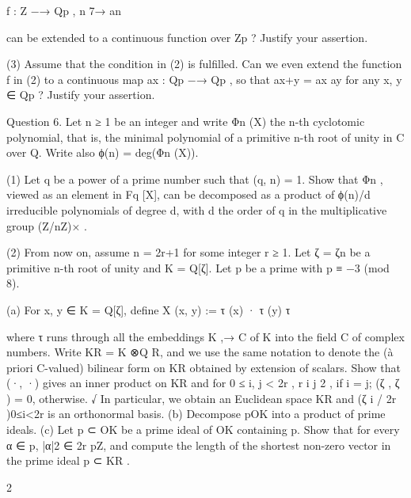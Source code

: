 \documentclass[UTF8,12pt]{ctexart}
\begin{document}
f : Z −→ Qp , n 7→ an

can be extended to a continuous function over Zp ? Justify your assertion.

(3) Assume that the condition in (2) is fulfilled. Can we even extend the function f in (2) to a continuous map ax : Qp −→ Qp , so that ax+y = ax ay for any x, y ∈ Qp ? Justify your assertion.

Question 6. Let n ≥ 1 be an integer and write Φn (X) the n-th cyclotomic polynomial, that is, the minimal polynomial of a primitive n-th root of unity in C over Q. Write also ϕ(n) = deg(Φn (X)).

(1) Let q be a power of a prime number such that (q, n) = 1. Show that Φn , viewed as an element in Fq [X], can be decomposed as a product of ϕ(n)/d irreducible polynomials of degree d, with d the order of q in the multiplicative group (Z/nZ)× .

(2) From now on, assume n = 2r+1 for some integer r ≥ 1. Let ζ = ζn be a primitive n-th root of unity and K = Q[ζ]. Let p be a prime with p ≡ −3 (mod 8).

(a) For x, y ∈ K = Q[ζ], define X (x, y) := τ (x) · τ (y) τ

where τ runs through all the embeddings K ,→ C of K into the field C of complex numbers. Write KR = K ⊗Q R, and we use the same notation to denote the (à priori C-valued) bilinear form on KR obtained by extension of scalars. Show that (·, ·) gives an inner product on KR and for 0 ≤ i, j < 2r , r i j 2 , if i = j; (ζ , ζ ) = 0, otherwise. √ In particular, we obtain an Euclidean space KR and (ζ i / 2r )0≤i<2r is an orthonormal basis. (b) Decompose pOK into a product of prime ideals. (c) Let p ⊂ OK be a prime ideal of OK containing p. Show that for every α ∈ p, |α|2 ∈ 2r pZ, and compute the length of the shortest non-zero vector in the prime ideal p ⊂ KR .

2
\end{document}
